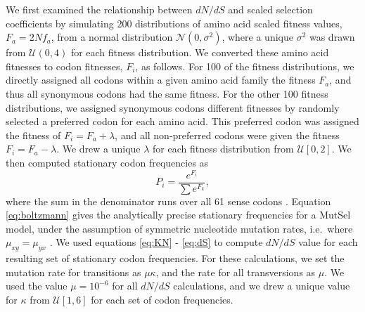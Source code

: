 \documentclass[11pt]{article}
\begin{document}
We first examined the relationship between $dN/dS$ and scaled selection coefficients by simulating 200 distributions of amino acid scaled fitness values, $F_a = 2Nf_a$, from a normal distribution $\mathcal{N}(0,\sigma^2)$, where a unique $\sigma^2$ was drawn from $\mathcal{U}(0,4)$ for each fitness distribution. We converted these amino acid fitnesses to codon fitnesses, $F_i$, as follows. For 100 of the fitness distributions, we directly assigned all codons within a given amino acid family the fitness $F_a$, and thus all synonymous codons had the same fitness. For the other 100 fitness distributions, we assigned synonymous codons different fitnesses by randomly selected a preferred codon for each amino acid. This preferred codon was assigned the fitness of $F_i = F_a + \lambda$, and all non-preferred codons were given the fitness $F_i = F_a - \lambda$. We drew a unique $\lambda$ for each fitness distribution from $\mathcal{U}[0,2]$. 
We then computed stationary codon frequencies as 
\begin{equation}\label{eq:boltzmann}
P_i = \frac{e^{F_i}}{\sum e^{F_k}}, 
\end{equation} where the sum in the denominator runs over all 61 sense codons \cite{SellaHirsh2005}. Equation \eqref{eq:boltzmann} gives the analytically precise stationary frequencies for a MutSel model, under the assumption of symmetric nucleotide mutation rates, i.e.\ where $\mu_{xy} = \mu_{yx}$ \cite{SellaHirsh2005}. We used equations \eqref{eq:KN} - \eqref{eq:dS} to compute $dN/dS$ value for each resulting set of stationary codon frequencies. For these calculations, we set the mutation rate for transitions as $\mu\kappa$, and the rate for all transversions as $\mu$. We used the value $\mu = 10^{-6}$ for all $dN/dS$ calculations, and we drew a unique value for $\kappa$ from $\mathcal{U}[1,6]$ for each set of codon frequencies.
\end{document}
